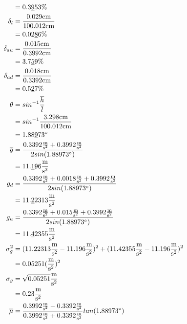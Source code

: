 \documentclass[12pt]{article}
\begin{document}
\begin{align}
            &= 0.3\underline{9}53 \% \nonumber \\
            \delta_l &= \frac{0.029\text{cm}}{100.012\text{cm}} \nonumber \\
            &= 0.02\underline{8}6\% \nonumber \\
            \delta_{au} &= \frac{0.015\text{cm}}{0.3992\text{cm}} \nonumber \\
            &= 3.7\underline{5}9 \% \nonumber \\ 
            \delta_{ad} &= \frac{0.018\text{cm}}{0.3392\text{cm}} \nonumber \\
            &= 0.5\underline{2}7 \% \nonumber \\
            \theta &= sin^{-1}\frac{\overline{h}}{\overline{l}}\\
            &= sin^{-1}\frac{3.298 \text{cm}}{100.012 \text{cm}}\nonumber \\
            & = 1.88\underline{9}73 \degree \nonumber \\
            \overline{g} &= \frac{0.3392 \frac{\text{m}}{\text{s}^2} + 0.3992 \frac{\text{m}}{\text{s}^2}}{2 sin(1.88973 \degree)} \\
            &= 11.\underline{1}96 \frac{\text{m}}{\text{s}^2}\\
            g_{d} &= \frac{0.3392\frac{\text{m}}{\text{s}^2} + 0.0018 \frac{\text{m}}{\text{s}^2} + 0.3992 \frac{\text{m}}{\text{s}^2}}{2 sin(1.88973 \degree)}\nonumber\\
            &= 11.\underline{2}2313 \frac{\text{m}}{\text{s}^2 }\nonumber \\
            g_u &= \frac{0.3392\frac{\text{m}}{\text{s}^2} + 0.015 \frac{\text{m}}{\text{s}^2} + 0.3992 \frac{\text{m}}{\text{s}^2}}{2 sin(1.88973 \degree)}\nonumber \\
            &= 11.\underline{4}2355 \frac{\text{m}}{\text{s}^2 }\nonumber\\
            \sigma^2_g &= (11.22313\frac{\text{m}}{\text{s}^2 } - 11.196\frac{\text{m}}{\text{s}^2 })^2 + (11.42355\frac{\text{m}}{\text{s}^2 } - 11.196\frac{\text{m}}{\text{s}^2 })^2 \nonumber \\
            &= 0.05251(\frac{\text{m}}{\text{s}^2 })^2\nonumber\\
            \sigma_g &= \sqrt{0.05251} \frac{\text{m}}{\text{s}^2 }\nonumber\\
            &= 0.23 \frac{\text{m}}{\text{s}^2 }\nonumber \\
            \overline{\mu} &= \frac{0.3992 \frac{\text{m}}{\text{s}^2} - 0.3392\frac{\text{m}}{\text{s}^2 }}{0.3992\frac{\text{m}}{\text{s}^2 }+0.3392\frac{\text{m}}{\text{s}^2 }}tan(1.88973\degree)\\

\end{align}
\end{document}
